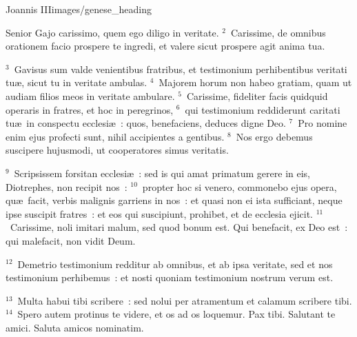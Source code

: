 \newpage
{}
{Joannis III}{images/genese_heading}

\noindent Senior Gajo carissimo, quem ego diligo in veritate.
${}^{2}$~Carissime, de omnibus orationem facio prospere te ingredi, et valere sicut prospere agit anima tua.


${}^{3}$~Gavisus sum valde venientibus fratribus, et testimonium perhibentibus veritati tu\ae , sicut tu in veritate ambulas.
${}^{4}$~Majorem horum non habeo gratiam, quam ut audiam filios meos in veritate ambulare.
${}^{5}$~Carissime, fideliter facis quidquid operaris in fratres, et hoc in peregrinos,
${}^{6}$~qui testimonium reddiderunt caritati tu\ae\ in conspectu ecclesi\ae~: quos, benefaciens, deduces digne Deo.
${}^{7}$~Pro nomine enim ejus profecti sunt, nihil accipientes a gentibus.
${}^{8}$~Nos ergo debemus suscipere hujusmodi, ut cooperatores simus veritatis.


${}^{9}$~Scripsissem forsitan ecclesi\ae~: sed is qui amat primatum gerere in eis, Diotrephes, non recipit nos~:
${}^{10}$~propter hoc si venero, commonebo ejus opera, qu\ae\ facit, verbis malignis garriens in nos~: et quasi non ei ista sufficiant, neque ipse suscipit fratres~: et eos qui suscipiunt, prohibet, et de ecclesia ejicit.
${}^{11}$~Carissime, noli imitari malum, sed quod bonum est. Qui benefacit, ex Deo est~: qui malefacit, non vidit Deum.


${}^{12}$~Demetrio testimonium redditur ab omnibus, et ab ipsa veritate, sed et nos testimonium perhibemus~: et nosti quoniam testimonium nostrum verum est.


${}^{13}$~Multa habui tibi scribere~: sed nolui per atramentum et calamum scribere tibi.
${}^{14}$~Spero autem protinus te videre, et os ad os loquemur. Pax tibi. Salutant te amici. Saluta amicos nominatim.
